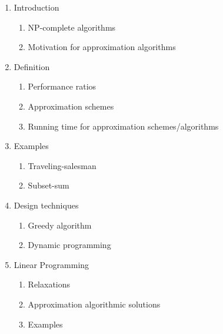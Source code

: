\documentclass[a4paper]{report}
\begin{document}
\begin{enumerate}
    \item Introduction
    \begin{enumerate}
	\item NP-complete algorithms
	\item Motivation for approximation algorithms
    \end{enumerate}
    \item Definition
    \begin{enumerate}
        \item Performance ratios
	\item Approximation schemes
	\item Running time for approximation schemes/algorithms
    \end{enumerate}
    \item Examples
    \begin{enumerate}
	\item Traveling-salesman
	\item Subset-sum
    \end{enumerate}
    \item Design techniques
    \begin{enumerate}
        \item Greedy algorithm
	\item Dynamic programming
    \end{enumerate}
    \item Linear Programming
    \begin{enumerate}
        \item Relaxations
	\item Approximation algorithmic solutions
	\item Examples
    \end{enumerate}
\end{enumerate}




\end{document}
